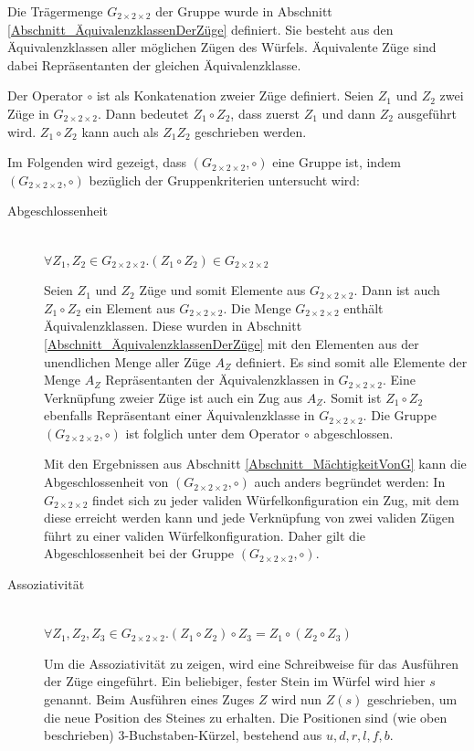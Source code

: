 \documentclass[12pt,a4paper, usenames, dvipsnames]{article}
\theoremstyle{mystyle}
\theoremstyle{definition}
\newcommand{\Gtwo}{\ensuremath{G_{2\times 2\times 2}}}
\begin{document}
Die Trägermenge $\Gtwo$ der Gruppe wurde in Abschnitt \ref{Abschnitt_ÄquivalenzklassenDerZüge} definiert. Sie besteht aus den Äquivalenzklassen aller möglichen Zügen des Würfels. Äquivalente Züge sind dabei Repräsentanten der gleichen Äquivalenzklasse.


Der Operator $\circ$ ist als Konkatenation zweier Züge definiert. Seien $Z_1$ und $Z_2$ zwei Züge in $\Gtwo$. Dann bedeutet $Z_1 \circ Z_2$, dass zuerst $Z_1$ und dann $Z_2$ ausgeführt wird. $Z_1 \circ Z_2$ kann auch als $Z_1Z_2$ geschrieben werden.

Im Folgenden wird gezeigt, dass $(\Gtwo, \circ)$ eine Gruppe ist, indem $(\Gtwo, \circ)$ bezüglich der Gruppenkriterien untersucht wird:


\begin{description}
\item [Abgeschlossenheit] \ \\
$\forall Z_1,Z_2 \in \Gtwo .  (Z_1 \circ Z_2) \in \Gtwo $ 


Seien $Z_1$ und $Z_2$ Züge und somit Elemente aus $\Gtwo$. Dann ist auch $Z_1 \circ Z_2$ ein Element aus $\Gtwo$. Die Menge $\Gtwo$ enthält Äquivalenzklassen. Diese wurden in Abschnitt \ref{Abschnitt_ÄquivalenzklassenDerZüge} mit den Elementen aus der unendlichen Menge aller Züge $A_Z$ definiert. Es sind somit alle Elemente der Menge $A_Z$ Repräsentanten der Äquivalenzklassen in $\Gtwo$. Eine Verknüpfung zweier Züge ist auch ein Zug aus $A_Z$. Somit ist $Z_1 \circ Z_2$ ebenfalls Repräsentant einer Äquivalenzklasse in $\Gtwo$. Die Gruppe $(\Gtwo, \circ)$ ist folglich unter dem Operator $\circ$ abgeschlossen.
 
Mit den Ergebnissen aus Abschnitt \ref{Abschnitt_MächtigkeitVonG} kann die Abgeschlossenheit von $(\Gtwo, \circ)$ auch anders begründet werden: In $\Gtwo$ findet sich zu jeder validen Würfelkonfiguration ein Zug, mit dem diese erreicht werden kann und jede Verknüpfung von zwei validen Zügen führt zu einer validen Würfelkonfiguration. Daher gilt die Abgeschlossenheit bei der Gruppe $(\Gtwo, \circ)$.


\item [Assoziativität] \ \\
$\forall Z_1,Z_2,Z_3 \in \Gtwo.(Z_1 \circ Z_2) \circ Z_3 = Z_1 \circ (Z_2 \circ Z_3)$ 


Um die Assoziativität zu zeigen, wird eine Schreibweise für das Ausführen der Züge eingeführt. Ein beliebiger, fester Stein im Würfel wird hier $s$ genannt. Beim Ausführen eines Zuges $Z$ wird nun $Z(s)$ geschrieben, um die neue Position des Steines zu erhalten. Die Positionen sind (wie oben beschrieben) 3-Buchstaben-Kürzel, bestehend aus $u, d, r, l, f, b$. 


\end{description}
\end{document}
